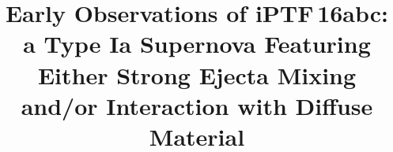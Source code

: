 \documentclass[twocolumn]{aastex61}
\newcommand{\abc}{iPTF\,16abc}
\begin{document}
\title{Early Observations of \abc:\\
\textbf{a Type Ia Supernova Featuring Either} Strong Ejecta Mixing and/or Interaction with Diffuse Material}


\end{document}
